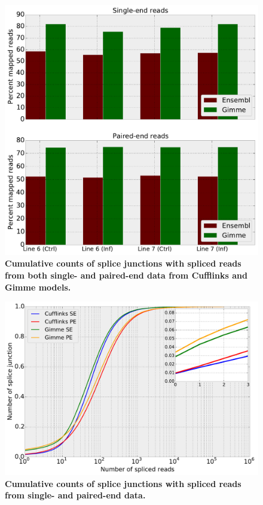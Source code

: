 \documentclass[10pt]{article}
\begin{document}
\begin{figure}[!ht]
\begin{center}
\includegraphics[width=5in]{mapped-reads.pdf}
\end{center}
\caption{
{\bf Cumulative counts of splice junctions with spliced reads from both single-
and paired-end data from Cufflinks and Gimme models.}
}
\label{mapped-reads}
\end{figure}

\begin{figure}[!ht]
\begin{center}
\includegraphics[width=5in]{cdf_splice.pdf}
\end{center}
\caption{
{\bf Cumulative counts of splice junctions with spliced reads from single- and
paired-end data.}
}
\label{cdf_splice}
\end{figure}
\end{document}
